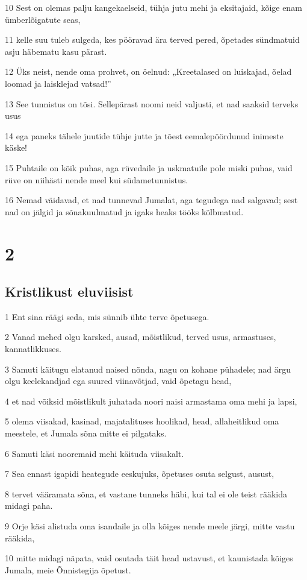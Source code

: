 \par 10 Sest on olemas palju kangekaelseid, tühja jutu mehi ja eksitajaid, kõige enam ümberlõigatute seas,
\par 11 kelle suu tuleb sulgeda, kes pööravad ära terved pered, õpetades sündmatuid asju häbematu kasu pärast.
\par 12 Üks neist, nende oma prohvet, on öelnud: „Kreetalased on luiskajad, õelad loomad ja laisklejad vatsad!”
\par 13 See tunnistus on tõsi. Sellepärast noomi neid valjusti, et nad saaksid terveks usus
\par 14 ega paneks tähele juutide tühje jutte ja tõest eemalepöördunud inimeste käske!
\par 15 Puhtaile on kõik puhas, aga rüvedaile ja uskmatuile pole miski puhas, vaid rüve on niihästi nende meel kui südametunnistus.
\par 16 Nemad väidavad, et nad tunnevad Jumalat, aga tegudega nad salgavad; sest nad on jälgid ja sõnakuulmatud ja igaks heaks tööks kõlbmatud.


\chapter{2}

\section*{Kristlikust eluviisist}

\par 1 Ent sina räägi seda, mis sünnib ühte terve õpetusega.
\par 2 Vanad mehed olgu karsked, ausad, mõistlikud, terved usus, armastuses, kannatlikkuses.
\par 3 Samuti käitugu elatanud naised nõnda, nagu on kohane pühadele; nad ärgu olgu keelekandjad ega suured viinavõtjad, vaid õpetagu head,
\par 4 et nad võiksid mõistlikult juhatada noori naisi armastama oma mehi ja lapsi,
\par 5 olema viisakad, kasinad, majatalituses hoolikad, head, allaheitlikud oma meestele, et Jumala sõna mitte ei pilgataks.
\par 6 Samuti käsi nooremaid mehi käituda viisakalt.
\par 7 Sea ennast igapidi heategude eeskujuks, õpetuses osuta selgust, ausust,
\par 8 tervet vääramata sõna, et vastane tunneks häbi, kui tal ei ole teist rääkida midagi paha.
\par 9 Orje käsi alistuda oma isandaile ja olla kõiges nende meele järgi, mitte vastu rääkida,
\par 10 mitte midagi näpata, vaid osutada täit head ustavust, et kaunistada kõiges Jumala, meie Õnnistegija õpetust.

